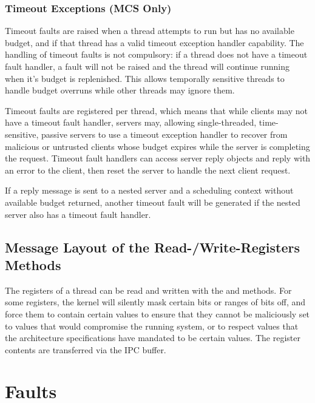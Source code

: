 \subsubsection{Timeout Exceptions (MCS Only)} \label{sec:timeout-exceptions}

Timeout faults are raised when a thread attempts to run but has no available
budget, and if that thread has a valid timeout exception handler capability.
The handling of timeout faults is not compulsory: if a thread does not have a
timeout fault handler, a fault will not be raised and the thread will continue
running when it's budget is replenished.  This allows temporally sensitive
threads to handle budget overruns while other threads may ignore them.

Timeout faults are registered per thread, which means that while clients may
not have a timeout fault handler, servers may, allowing single-threaded,
time-sensitive, passive servers to use a timeout exception handler to recover
from malicious or untrusted clients whose budget expires while the server is
completing the request.  Timeout fault handlers can access server reply objects
and reply with an error to the client, then reset the server to handle the next
client request.

If a reply message is sent to a nested server and a scheduling context without
available budget returned, another timeout fault will be generated if the
nested server also has a timeout fault handler.

\subsection{Message Layout of the Read-/Write-Registers Methods}
\label{sec:read_write_registers}

The registers of a thread can be read and written with the
 and  methods.
For some registers, the kernel will silently mask certain bits or ranges of bits off, and force them to contain certain
values to ensure that they cannot be maliciously set to values that would compromise the running system, or to respect
values that the architecture specifications have mandated to be certain values.
The register contents are transferred via the IPC buffer.

\section{Faults}
\label{sec:faults}

